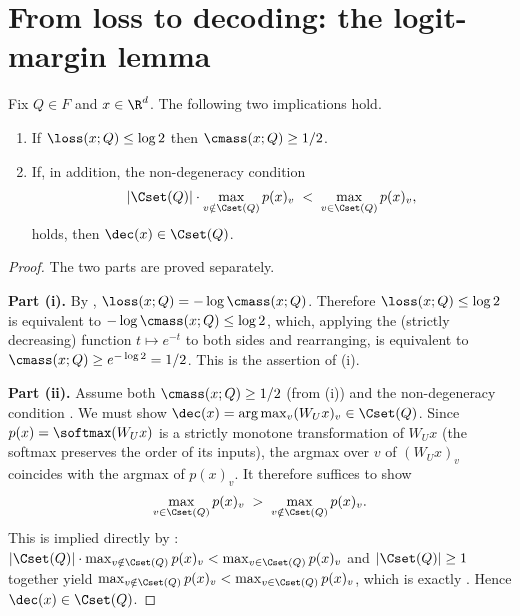 \section{From loss to decoding: the logit-margin lemma}
\label{sec:logit_margin_decoding}

\begin{lemma}\label{lem:logit_margin_decoding}
Fix $Q \in F$ and $x \in \R^d$. The following two implications hold.
\begin{enumerate}[label=(\roman*),leftmargin=*]
\item If $\loss(x; Q) \le \log 2$ then $\cmass(x; Q) \ge 1/2$.
\item If, in addition, the non-degeneracy condition
\begin{align}\label{eq:logit_margin_nondegen}
   |\Cset(Q)| \cdot \max_{v \notin \Cset(Q)} p(x)_v
   \;<\;
   \max_{v \in \Cset(Q)} p(x)_v,
\end{align}
holds, then $\dec(x) \in \Cset(Q)$.
\end{enumerate}
\end{lemma}

\begin{proof}
The two parts are proved separately.

\noindent\textbf{Part (i).}
By , $\loss(x; Q) = -\log \cmass(x; Q)$. Therefore
$\loss(x; Q) \le \log 2$ is equivalent to $-\log \cmass(x; Q) \le \log 2$,
which, applying the (strictly decreasing) function $t \mapsto e^{-t}$
to both sides and rearranging, is equivalent to
$\cmass(x; Q) \ge e^{-\log 2} = 1/2$. This is the assertion of (i).

\noindent\textbf{Part (ii).}
Assume both $\cmass(x; Q) \ge 1/2$ (from (i)) and the non-degeneracy
condition . We must show
$\dec(x) = \arg\max_v (W_U x)_v \in \Cset(Q)$. Since
$p(x) = \softmax(W_U x)$ is a strictly monotone transformation of
$W_U x$ (the softmax preserves the order of its inputs), the argmax over
$v$ of $(W_U x)_v$ coincides with the argmax of $p(x)_v$. It therefore
suffices to show
\begin{align}\label{eq:logit_margin_p_argmax}
   \max_{v \in \Cset(Q)} p(x)_v
   \;>\;
   \max_{v \notin \Cset(Q)} p(x)_v.
\end{align}
This is implied directly by :
$|\Cset(Q)| \cdot \max_{v \notin \Cset(Q)} p(x)_v < \max_{v \in \Cset(Q)} p(x)_v$
and $|\Cset(Q)| \ge 1$ together yield
$\max_{v \notin \Cset(Q)} p(x)_v < \max_{v \in \Cset(Q)} p(x)_v$, which is
exactly . Hence $\dec(x) \in \Cset(Q)$.
\end{proof}

